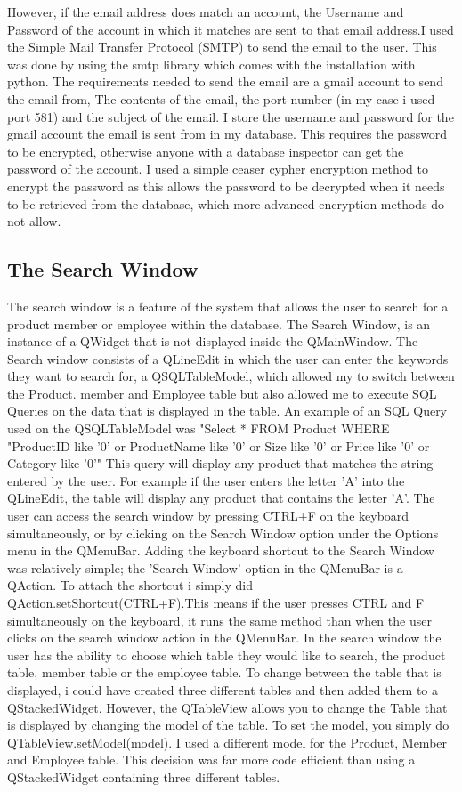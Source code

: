 However, if the email address does match an account, the Username and Password of the account in which it matches are sent to that email address.I used the Simple Mail Transfer Protocol (SMTP) to send the email to the user. This was done by using the smtp library which comes with the installation with python. The requirements needed to send the email are a gmail account to send the email from, The contents of the email, the port number (in my case i used port 581) and the subject of the email. I store the username and password for the gmail account the email is sent from in my database. This requires the password to be encrypted, otherwise anyone with a database inspector can get the password of the account. I used a simple ceaser cypher encryption method to encrypt the password as this allows the password to be decrypted when it needs to be retrieved from the database, which more advanced encryption methods do not allow.


\subsection{The Search Window}

The search window is a feature of the system that allows the user to search for a product member or employee within the database. The Search Window, is an instance of a QWidget that is not displayed inside the QMainWindow. The Search window consists of a QLineEdit in which the user can enter the keywords they want to search for, a QSQLTableModel, which allowed my to switch between the Product. member and Employee table but also allowed me to execute SQL Queries on the data that is displayed in the table. An example of an  SQL Query used on the QSQLTableModel was "Select * FROM Product WHERE "ProductID like '{0}' or ProductName like '{0}' or Size like '{0}' or Price like '{0}' or Category like '{0}'" This query will display any product that matches the string entered by the user. For example if the user enters the letter 'A' into the QLineEdit, the table will display any product that contains the letter 'A'. The user can access the search window by pressing CTRL+F on the keyboard simultaneously, or by clicking on the Search Window option under the Options menu in the QMenuBar. Adding the keyboard shortcut to the Search Window was relatively simple; the 'Search Window' option in the QMenuBar is a QAction. To attach the shortcut i simply did QAction.setShortcut(CTRL+F).This means if the user presses CTRL and F simultaneously on the keyboard, it runs the same method than when the user clicks on the search window action in the QMenuBar. In the search window the user has the ability to choose which table they would like to search, the product table, member table or the employee table. To change between the table that is displayed, i could have created three different tables and then added them to a QStackedWidget. However, the QTableView allows you to change the Table that is displayed by changing the model of the table. To set the model, you simply do QTableView.setModel(model). I used a different model for the Product, Member and Employee table. This decision was far more code efficient than using a QStackedWidget containing three different tables.

